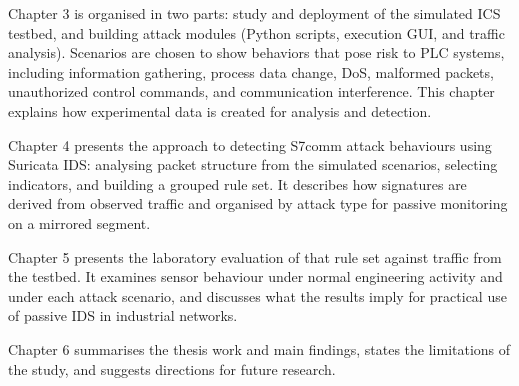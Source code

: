 \documentclass[../main.tex]{subfiles}
\begin{document}
Chapter 3 is organised in two parts: study and deployment of the simulated ICS testbed, and building attack modules (Python scripts, execution GUI, and traffic analysis). Scenarios are chosen to show behaviors that pose risk to PLC systems, including information gathering, process data change, DoS, malformed packets, unauthorized control commands, and communication interference. This chapter explains how experimental data is created for analysis and detection.

Chapter 4 presents the approach to detecting S7comm attack behaviours using Suricata IDS: analysing packet structure from the simulated scenarios, selecting indicators, and building a grouped rule set. It describes how signatures are derived from observed traffic and organised by attack type for passive monitoring on a mirrored segment.

Chapter 5 presents the laboratory evaluation of that rule set against traffic from the testbed. It examines sensor behaviour under normal engineering activity and under each attack scenario, and discusses what the results imply for practical use of passive IDS in industrial networks.

Chapter 6 summarises the thesis work and main findings, states the limitations of the study, and suggests directions for future research.
\end{document}
